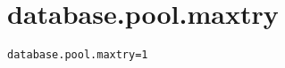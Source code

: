 \section{database.pool.maxtry}
\label{configuration:DatabasePoolMaxtry}
\ClearAPI
\TODO
{}
\begin{lstlisting}[style=Props,caption={Usage example for \textit{database.pool.maxtry}}]
database.pool.maxtry=1
\end{lstlisting}
